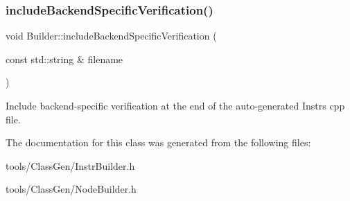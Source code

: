 \subsubsection{\texorpdfstring{include\+Backend\+Specific\+Verification()}{includeBackendSpecificVerification()}\hspace{0.1cm}{\footnotesize\ttfamily [2/2]}}
{\footnotesize\ttfamily void Builder\+::include\+Backend\+Specific\+Verification (\begin{DoxyParamCaption}\item[{const std\+::string \&}]{filename }\end{DoxyParamCaption})\hspace{0.3cm}{\ttfamily [inline]}}

Include backend-\/specific verification at the end of the auto-\/generated Instrs cpp file. 

The documentation for this class was generated from the following files\+:\begin{DoxyCompactItemize}
\item 
tools/\+Class\+Gen/Instr\+Builder.\+h\item 
tools/\+Class\+Gen/Node\+Builder.\+h\end{DoxyCompactItemize}
